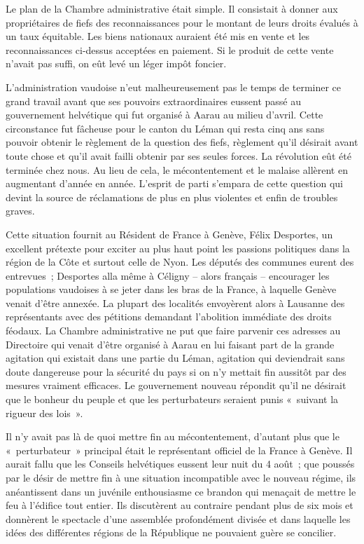 \documentclass[french,twoside]{book} %
\begin{document}
Le plan de la Chambre administrative était simple. Il consistait à donner aux propriétaires de fiefs des reconnaissances pour le montant de leurs droits évalués à un taux équitable. Les biens nationaux auraient été mis en vente et les reconnaissances ci-dessus acceptées en paiement. Si le produit de cette vente n’avait pas suffi, on eût levé un léger impôt foncier.\par
L’administration vaudoise n’eut malheureusement pas le temps de terminer ce grand travail avant que ses pouvoirs extraordinaires eussent passé au gouvernement helvétique qui fut organisé à Aarau au milieu d’avril. Cette circonstance fut fâcheuse pour le canton du Léman qui resta cinq ans sans pouvoir obtenir le règlement de la question des fiefs, règlement qu’il désirait avant toute chose et qu’il avait failli obtenir par ses seules forces. La révolution eût été terminée chez nous. Au lieu de cela, le mécontentement et le malaise allèrent en augmentant d’année en année. L’esprit de parti s’empara de cette question qui devint la source de réclamations de plus en plus violentes et enfin de troubles graves.\par
Cette situation fournit au Résident de France à Genève, Félix Desportes, un excellent prétexte pour exciter au plus haut point les passions politiques dans la région de la Côte et surtout celle de Nyon. Les députés des communes eurent des entrevues ; Desportes alla même à Céligny – alors français – encourager les populations vaudoises à se jeter dans les bras de la France, à laquelle Genève venait d’être annexée. La plupart des localités envoyèrent alors à Lausanne des représentants avec des pétitions demandant l’abolition immédiate des droits féodaux. La Chambre administrative ne put que faire parvenir ces adresses au Directoire qui venait d’être organisé à Aarau en lui faisant part de la grande agitation qui existait dans une partie du Léman, agitation qui deviendrait sans doute dangereuse pour la sécurité du pays si on n’y mettait fin aussitôt par des mesures vraiment efficaces. Le gouvernement nouveau répondit qu’il ne désirait que le bonheur du peuple et que les perturbateurs seraient punis « suivant la rigueur des lois ».\par
Il n’y avait pas là de quoi mettre fin au mécontentement, d’autant plus que le « perturbateur » principal était le représentant officiel de la France à Genève. Il aurait fallu que les Conseils helvétiques eussent leur nuit du 4 août ; que poussés par le désir de mettre fin à une situation incompatible avec le nouveau régime, ils anéantissent dans un juvénile enthousiasme ce brandon qui menaçait de mettre le feu à l’édifice tout entier. Ils discutèrent au contraire pendant plus de six mois et donnèrent le spectacle d’une assemblée profondément divisée et dans laquelle les idées des différentes régions de la République ne pouvaient guère se concilier.\par
\end{document}
